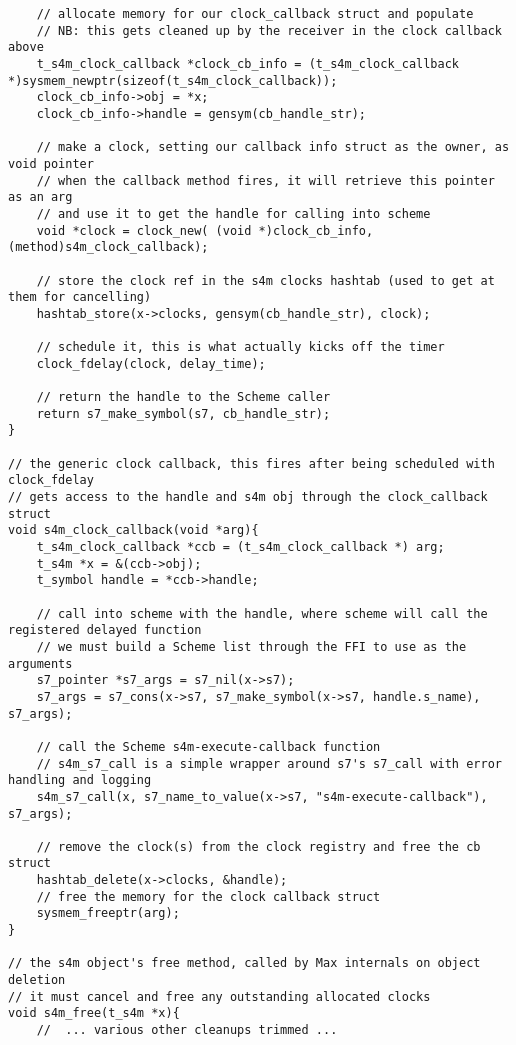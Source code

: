 \documentclass[acmsmall]{acmart}
\begin{document}
{\begin{verbatim}
    // allocate memory for our clock_callback struct and populate
    // NB: this gets cleaned up by the receiver in the clock callback above
    t_s4m_clock_callback *clock_cb_info = (t_s4m_clock_callback *)sysmem_newptr(sizeof(t_s4m_clock_callback));
    clock_cb_info->obj = *x;
    clock_cb_info->handle = gensym(cb_handle_str);

    // make a clock, setting our callback info struct as the owner, as void pointer
    // when the callback method fires, it will retrieve this pointer as an arg 
    // and use it to get the handle for calling into scheme  
    void *clock = clock_new( (void *)clock_cb_info, (method)s4m_clock_callback);

    // store the clock ref in the s4m clocks hashtab (used to get at them for cancelling) 
    hashtab_store(x->clocks, gensym(cb_handle_str), clock); 

    // schedule it, this is what actually kicks off the timer
    clock_fdelay(clock, delay_time);

    // return the handle to the Scheme caller
    return s7_make_symbol(s7, cb_handle_str);
}

// the generic clock callback, this fires after being scheduled with clock_fdelay 
// gets access to the handle and s4m obj through the clock_callback struct 
void s4m_clock_callback(void *arg){
    t_s4m_clock_callback *ccb = (t_s4m_clock_callback *) arg;
    t_s4m *x = &(ccb->obj);
    t_symbol handle = *ccb->handle; 
  
    // call into scheme with the handle, where scheme will call the registered delayed function
    // we must build a Scheme list through the FFI to use as the arguments
    s7_pointer *s7_args = s7_nil(x->s7);
    s7_args = s7_cons(x->s7, s7_make_symbol(x->s7, handle.s_name), s7_args); 

    // call the Scheme s4m-execute-callback function
    // s4m_s7_call is a simple wrapper around s7's s7_call with error handling and logging 
    s4m_s7_call(x, s7_name_to_value(x->s7, "s4m-execute-callback"), s7_args);   

    // remove the clock(s) from the clock registry and free the cb struct
    hashtab_delete(x->clocks, &handle);
    // free the memory for the clock callback struct 
    sysmem_freeptr(arg);
}

// the s4m object's free method, called by Max internals on object deletion
// it must cancel and free any outstanding allocated clocks
void s4m_free(t_s4m *x){ 
    //  ... various other cleanups trimmed ...


\end{verbatim}}
\end{document}
